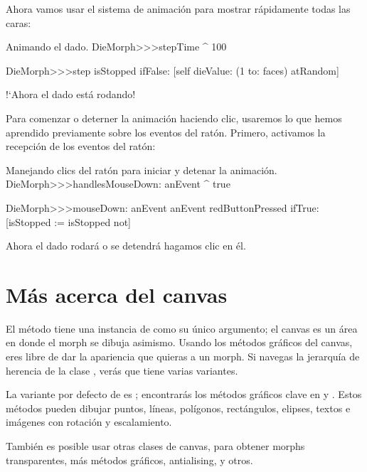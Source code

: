 \documentclass[a4paper,10pt,twoside]{book}
\begin{document}
Ahora vamos usar el sistema de animaci\'on para mostrar r\'apidamente todas las caras:
\begin{methods}{Animando el dado.}
DieMorph>>>stepTime
	^ 100

DieMorph>>>step
	isStopped ifFalse: [self dieValue: (1 to: faces) atRandom]
\end{methods}
!`Ahora el dado est\'a rodando!

Para comenzar o deterner la animaci\'on haciendo clic, usaremos lo que hemos aprendido previamente sobre los eventos del  rat\'on.
Primero, activamos la recepci\'on de los eventos del rat\'on:

\begin{methods}{Manejando clics del rat\'on para iniciar y detenar la animaci\'on.}
DieMorph>>>handlesMouseDown: anEvent
	^ true

DieMorph>>>mouseDown: anEvent
	anEvent redButtonPressed
		ifTrue: [isStopped := isStopped not]
\end{methods}
Ahora el dado rodar\'a o se detendr\'a hagamos clic en \'el.



\section{M\'as acerca del canvas}

El método  tiene una instancia de  como su \'unico argumento;
el canvas es un \'area en donde el morph se dibuja asimismo.
Usando los m\'etodos gr\'aficos del canvas, eres libre de dar la apariencia que quieras a un morph.
Si navegas la jerarqu\'ia de herencia de la clase , ver\'as que tiene varias variantes.

La variante por defecto de  es ; encontrar\'as los m\'etodos gr\'aficos clave en  y .
Estos m\'etodos pueden dibujar puntos, l\'ineas, pol\'igonos, rect\'angulos, elipses, textos e im\'agenes con rotaci\'on y escalamiento.

Tambi\'en es posible usar otras clases de canvas, para obtener morphs transparentes, m\'as m\'etodos gr\'aficos, antialising, y otros.
\end{document}

